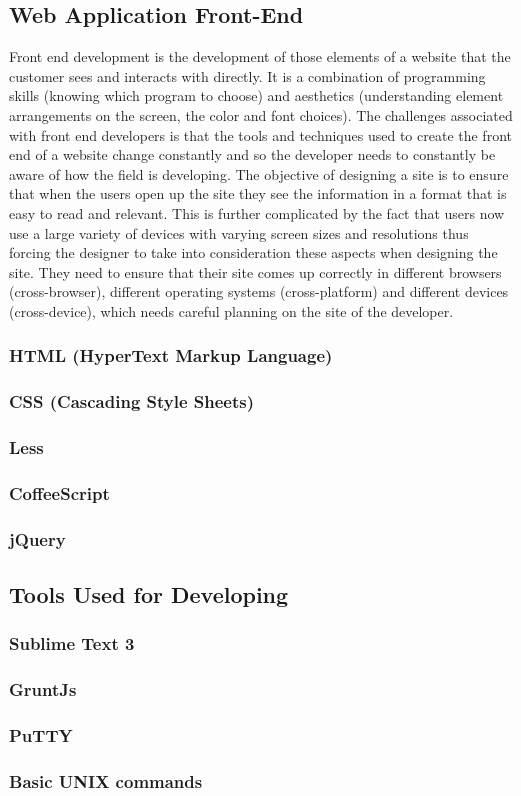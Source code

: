 \subsection{Web Application Front-End} 
Front end development is the development of those elements of a website that the customer sees and interacts with directly. It is a combination of programming skills (knowing which program to choose) and aesthetics (understanding element arrangements on the screen, the color and font choices). The challenges associated with front end developers is that the tools and techniques used to create the front end of a website change constantly and so the developer needs to constantly be aware of how the field is developing.
The objective of designing a site is to ensure that when the users open up the site they see the information in a format that is easy to read and relevant. This is further complicated by the fact that users now use a large variety of devices with varying screen sizes and resolutions thus forcing the designer to take into consideration these aspects when designing the site. They need to ensure that their site comes up correctly in different browsers (cross-browser), different operating systems (cross-platform) and different devices (cross-device), which needs careful planning on the site of the developer.
\subsubsection{HTML (HyperText Markup Language)}
\subsubsection{CSS (Cascading Style Sheets)}
\subsubsection{Less}
\subsubsection{CoffeeScript}
\subsubsection{jQuery}
\subsection{Tools Used for Developing}
\subsubsection{Sublime Text 3}
\subsubsection{GruntJs}
\subsubsection{PuTTY}
\subsubsection{Basic UNIX commands}
